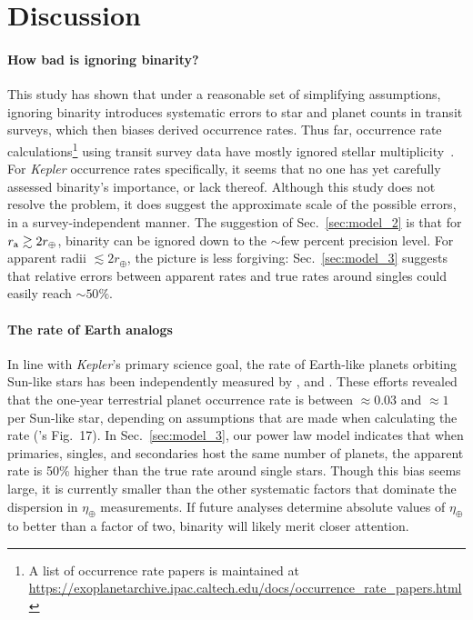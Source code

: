 \documentclass[12pt,modern]{aastex61}
\renewcommand{\a}{_{\rm a}}
\begin{document}
%

\section{Discussion}
\label{sec:discussion}


\paragraph{How bad is ignoring binarity?}
This study has shown that under a reasonable set of simplifying assumptions, 
ignoring binarity introduces systematic errors to star and planet counts in 
transit surveys, which then biases derived occurrence rates.
Thus far, occurrence rate calculations\footnote{
    A list of occurrence rate papers is maintained at 
    \url{https://exoplanetarchive.ipac.caltech.edu/docs/occurrence_rate_papers.html}
} using transit survey data have mostly ignored stellar 
multiplicity~\citep[\textit{e.g.},][]{howard_planet_2012,fressin_false_2013,foreman-mackey_exoplanet_2014,dressing_occurrence_2015,burke_terrestrial_2015}.
For {\it Kepler} occurrence rates specifically, 
it seems that no one has yet carefully assessed binarity's importance, or lack 
thereof.
Although this study does not resolve the problem, it does suggest the 
approximate scale of the possible errors, in a survey-independent manner.
The suggestion of Sec.~\ref{sec:model_2} is that for $r\a \gtrsim 2r_\oplus$, 
binarity can be ignored down to the $\sim$few percent precision level.
For apparent radii $\lesssim 2r_\oplus$, the picture is less forgiving:
Sec.~\ref{sec:model_3} suggests that relative errors between apparent rates 
and true rates around singles could easily reach $\sim\! 50\%$.

\paragraph{The rate of Earth analogs}
In line with {\it Kepler}'s primary science goal, the rate of Earth-like 
planets orbiting Sun-like stars has been independently measured by 
\citet{youdin_exoplanet_2011,petigura_prevalence_2013,dong_fast_2013,
    foreman-mackey_exoplanet_2014}, and \citet{burke_terrestrial_2015}.
These efforts revealed that the one-year terrestrial planet occurrence rate 
is between $\approx\! 0.03$ and $\approx\!1$ per Sun-like star,
depending on assumptions that are made when calculating the rate 
(\citealt{burke_terrestrial_2015}'s Fig.~17).
In Sec.~\ref{sec:model_3}, our power law model indicates that when primaries, 
singles, and secondaries host the same number of planets, the apparent rate is 
50\% higher than the true rate around single stars.
Though this bias seems large, it is currently smaller than the other 
systematic factors that dominate the dispersion in $\eta_\oplus$ 
measurements.
If future analyses determine absolute values of $\eta_\oplus$ to 
better than a factor of two, binarity will likely merit closer attention.
\end{document}
